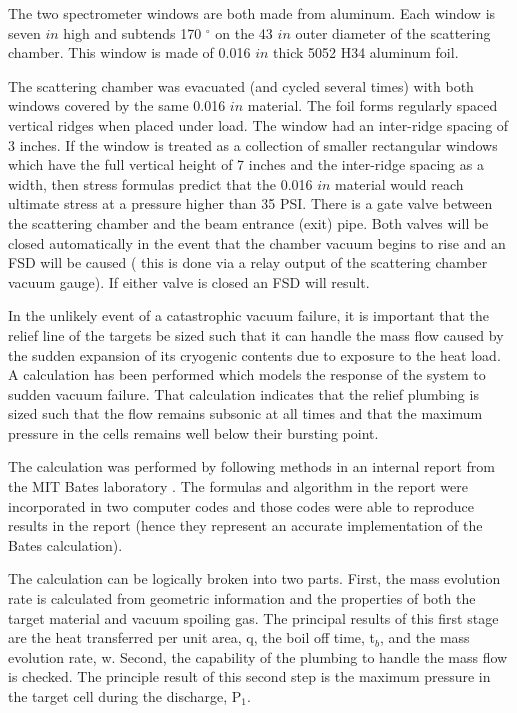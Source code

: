 {\begin{safetyen}{10}{5}
The two spectrometer windows are both made from aluminum. Each window
is seven $in$ high and subtends 170 $^\circ$ on the 43 $in$ outer
diameter of the scattering chamber. This window is made of
0.016 $in$ thick 5052 H34 aluminum foil.

The scattering chamber was evacuated (and cycled several times)
with both windows covered by the same 0.016 $in$ material. 
The foil forms regularly spaced vertical ridges when
placed under load. The window had an inter-ridge
spacing of 3 inches.
If the window is treated as a collection
of smaller rectangular windows which have the full vertical height
of 7 inches and the inter-ridge spacing as a width,
then stress formulas predict that the 0.016 $in$
material would reach ultimate stress at a pressure higher than 35 PSI. 
There is a gate valve between the 
scattering chamber and the beam entrance (exit) 
pipe. Both 
valves will be closed automatically in the
event that the chamber vacuum begins to rise and an FSD will be caused
( this is done via a relay output of the scattering
chamber vacuum gauge). If either valve is closed an FSD will result.

In the unlikely event of a catastrophic vacuum failure, it
is important that the relief line of the targets be sized
such that it can handle the mass flow caused by the sudden
expansion of its cryogenic contents due to exposure to the
heat load. A calculation has been performed which
models the response of the system to sudden vacuum failure.
That calculation indicates that the relief plumbing is sized such that the
flow remains subsonic at all times and that the maximum pressure
in the cells remains well below their bursting point.

\end{safetyen}

The calculation was performed  by following methods in 
an internal report from the MIT Bates
laboratory \cite{bi:bates}. The formulas and algorithm in the report were
incorporated in two computer codes and those codes were able to reproduce
results in the report (hence they represent an accurate implementation
of the Bates calculation).

The calculation can be logically broken into two parts. First,
the mass evolution rate is calculated from geometric information
and the properties of both the target material and vacuum spoiling gas.
The principal results of this first stage are the heat transferred
per unit area, q, the boil off time, t$_b$, and the mass evolution rate, w.
Second, the capability of the plumbing to handle the mass flow
is checked. The principle result of this second step is the
maximum pressure in the target cell during the discharge, P$_1$.

}
